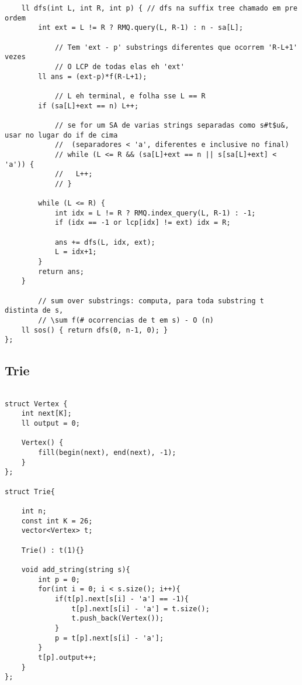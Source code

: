 \documentclass[11pt, a4paper, twoside]{article}
\begin{document}
\begin{verbatim}
	ll dfs(int L, int R, int p) { // dfs na suffix tree chamado em pre ordem
		int ext = L != R ? RMQ.query(L, R-1) : n - sa[L];
    
    		// Tem 'ext - p' substrings diferentes que ocorrem 'R-L+1' vezes
    		// O LCP de todas elas eh 'ext'
		ll ans = (ext-p)*f(R-L+1);
    
    		// L eh terminal, e folha sse L == R
		if (sa[L]+ext == n) L++;
    
    		// se for um SA de varias strings separadas como s#t$u&, usar no lugar do if de cima
    		//	(separadores < 'a', diferentes e inclusive no final)
    		// while (L <= R && (sa[L]+ext == n || s[sa[L]+ext] < 'a')) {
    		//   L++;
    		// }
    
		while (L <= R) {
			int idx = L != R ? RMQ.index_query(L, R-1) : -1;
			if (idx == -1 or lcp[idx] != ext) idx = R;
    
			ans += dfs(L, idx, ext);
			L = idx+1;
		}
		return ans;
	}
    
    	// sum over substrings: computa, para toda substring t distinta de s,
    	// \sum f(# ocorrencias de t em s) - O (n)
	ll sos() { return dfs(0, n-1, 0); }
};
\end{verbatim}

\subsection{Trie}
\begin{verbatim}

struct Vertex {
    int next[K];
    ll output = 0;
    
    Vertex() {
        fill(begin(next), end(next), -1);
    }
};

struct Trie{
    
    int n;
    const int K = 26;
    vector<Vertex> t;
    
    Trie() : t(1){}
    
    void add_string(string s){
        int p = 0;
        for(int i = 0; i < s.size(); i++){
            if(t[p].next[s[i] - 'a'] == -1){
                t[p].next[s[i] - 'a'] = t.size();
                t.push_back(Vertex());
            }
            p = t[p].next[s[i] - 'a'];
        }
        t[p].output++;
    }
};
\end{verbatim}
\end{document}
